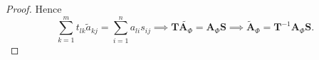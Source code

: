 \documentclass[11pt,openany]{article}
\begin{document}
\begin{proof}
	Hence \[
	\sum_{k=1}^mt_{lk}\tilde{a}_{kj}=\sum_{i=1}^na_{li}s_{ij}\implies\textbf{T}\tilde{\textbf{A}_\Phi}=\textbf{A}_\Phi\textbf{S}\implies\tilde{\textbf{A}}_\Phi=\textbf{T}^{-1}\textbf{A}_\Phi \textbf{S}.
	\]
\end{proof}
\end{document}
